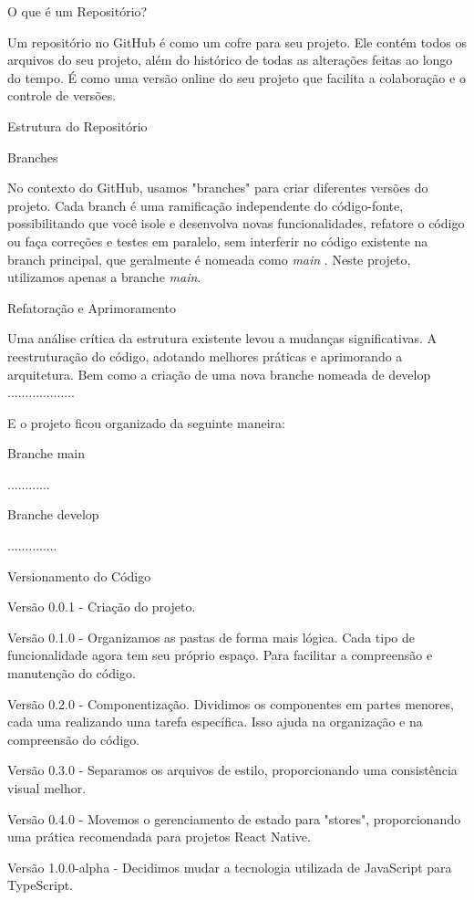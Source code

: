 \begin{itemize}
\begin{itemize}
O que é um Repositório?

Um repositório no GitHub é como um cofre para seu projeto. Ele contém todos os arquivos do seu projeto, além do histórico de todas as alterações feitas ao longo do tempo. É como uma versão online do seu projeto que facilita a colaboração e o controle de versões.

Estrutura do Repositório

Branches

No contexto do GitHub, usamos "branches" para criar diferentes versões do projeto. Cada branch é uma ramificação independente do código-fonte, possibilitando que você isole e desenvolva novas funcionalidades, refatore o código ou faça correções e testes em paralelo, sem interferir no código existente na branch principal, que geralmente é nomeada como \textit{main} \cite{al}. Neste projeto, utilizamos apenas a branche \textit{main}.


Refatoração e Aprimoramento

Uma análise crítica da estrutura existente levou a mudanças significativas. A reestruturação do código, adotando melhores práticas e aprimorando a arquitetura. Bem como a criação de uma nova branche nomeada de develop ...................

E o projeto ficou organizado da seguinte maneira: 

Branche main

............

Branche develop

..............

Versionamento do Código

Versão 0.0.1 -  Criação do projeto.

Versão 0.1.0 - Organizamos as pastas de forma mais lógica. Cada tipo de funcionalidade agora tem seu próprio espaço. Para facilitar a compreensão e manutenção do código.

Versão 0.2.0 - Componentização. Dividimos os componentes em partes menores, cada uma realizando uma tarefa específica. Isso ajuda na organização e na compreensão do código.

Versão 0.3.0 - Separamos os arquivos de estilo, proporcionando uma consistência visual melhor.

Versão 0.4.0 - Movemos o gerenciamento de estado para "stores", proporcionando uma prática recomendada para projetos React Native.

Versão 1.0.0-alpha - Decidimos mudar a tecnologia utilizada de JavaScript para TypeScript.



\end{itemize}
\end{itemize}
